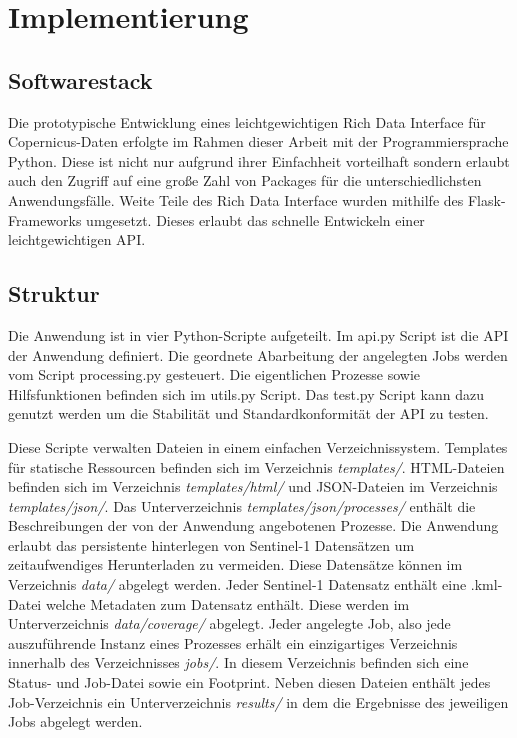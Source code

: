 \newpage
\restoregeometry
\section{Implementierung}
\subsection{Softwarestack}
Die prototypische Entwicklung eines leichtgewichtigen Rich Data Interface für Copernicus-Daten erfolgte im Rahmen dieser Arbeit mit der Programmiersprache Python.
Diese ist nicht nur aufgrund ihrer Einfachheit vorteilhaft sondern erlaubt auch den Zugriff auf eine große Zahl von Packages für die unterschiedlichsten 
Anwendungsfälle. 
Weite Teile des Rich Data Interface wurden mithilfe des Flask-Frameworks umgesetzt. Dieses erlaubt das schnelle Entwickeln einer leichtgewichtigen API.   

\subsection{Struktur}
Die Anwendung ist in vier Python-Scripte aufgeteilt. Im api.py Script ist die API der Anwendung definiert. 
Die geordnete Abarbeitung der angelegten Jobs werden vom Script processing.py gesteuert. Die eigentlichen Prozesse sowie 
Hilfsfunktionen befinden sich im utils.py Script. Das test.py Script kann dazu genutzt werden um die Stabilität und Standardkonformität der API zu testen.

Diese Scripte verwalten Dateien in einem einfachen Verzeichnissystem. Templates für statische Ressourcen befinden sich im Verzeichnis \textit{templates/}. HTML-Dateien 
befinden sich im Verzeichnis \textit{templates/html/} und JSON-Dateien im Verzeichnis \textit{templates/json/}. Das Unterverzeichnis \textit{templates/json/processes/} enthält die 
Beschreibungen der von der Anwendung angebotenen Prozesse. 
Die Anwendung erlaubt das persistente hinterlegen von Sentinel-1 Datensätzen um zeitaufwendiges Herunterladen zu vermeiden. Diese Datensätze können im Verzeichnis \textit{data/} abgelegt werden. Jeder Sentinel-1 Datensatz enthält eine .kml-Datei welche 
Metadaten zum Datensatz enthält. Diese werden im Unterverzeichnis \textit{data/coverage/} abgelegt. 
Jeder angelegte Job, also jede auszuführende Instanz eines Prozesses erhält ein einzigartiges Verzeichnis innerhalb des Verzeichnisses \textit{jobs/}. In diesem 
Verzeichnis befinden sich eine Status- und Job-Datei sowie ein Footprint. Neben diesen Dateien enthält jedes Job-Verzeichnis ein Unterverzeichnis \textit{results/} in dem
die Ergebnisse des jeweiligen Jobs abgelegt werden.

